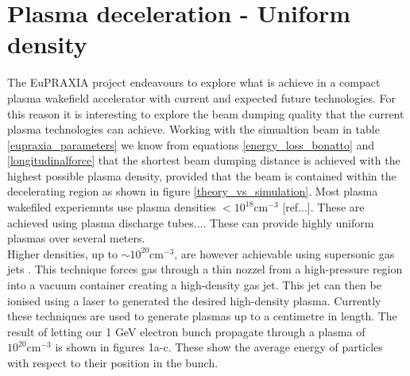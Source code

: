 \section{Plasma deceleration - Uniform density}
The EuPRAXIA project endeavours to explore what is achieve in a compact plasma wakefield accelerator with current and expected future technologies. For this reason it is interesting to explore the beam dumping quality that the current plasma technologies can achieve. Working with the simualtion beam in table \ref{eupraxia_parameters} we know from equations \ref{energy_loss_bonatto} and \ref{longitudinalforce} that the shortest beam dumping distance is achieved with the highest possible plasma density, provided that the beam is contained within the decelerating region as shown in figure \ref{theory_vs_simulation}. Most plasma wakefiled experiemnts use plasma densities $<10^18 \text{cm}^{-3}$ [ref...]. These are achieved using plasma discharge tubes.... These can provide highly uniform plasmas over several meters.\\
Higher densities, up to $\sim 10^20 \text{cm}^{-3}$, are however achievable using supersonic gas jets \cite{Schmid2012}. This technique forces gas through a thin nozzel from a high-pressure region into a vacuum container creating a high-density gas jet. This jet can then be ionised using a laser to generated the desired high-density plasma. Currently these techniques are used to generate plasmas up to a centimetre in length. The result of letting our 1 GeV electron bunch propagate through a plasma of $10^20 \text{cm}^{-3}$ is shown in figures 1a-c. These show the average energy of particles with respect to their position in the bunch.  
